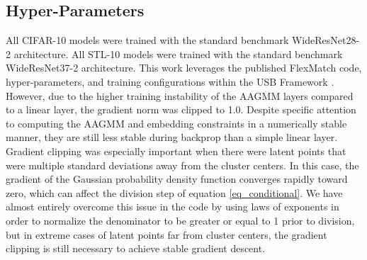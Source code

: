 \documentclass[10pt,twocolumn,letterpaper]{article}
\begin{document}
\subsection{Hyper-Parameters}
\label{hyperparams}

All CIFAR-10 models were trained with the standard benchmark WideResNet28-2 architecture.
All STL-10 models were trained with the standard benchmark WideResNet37-2 architecture.
This work leverages the published FlexMatch \cite{zhang2021flexmatch} code, hyper-parameters, and training configurations within the USB Framework \cite{wang2022usb}.
However, due to the higher training instability of the AAGMM layers compared to a linear layer, the gradient norm was clipped to 1.0.
Despite specific attention to computing the AAGMM and embedding constraints in a numerically stable manner, they are still less stable during backprop than a simple linear layer.  
Gradient clipping was especially important when there were latent points that were multiple standard deviations away from the cluster centers.  
In this case, the gradient of the Gaussian probability density function converges rapidly toward zero, which can affect the division step of equation \ref{eq_conditional}.  
We have almost entirely overcome this issue in the code by using laws of exponents in order to normalize the denominator to be greater or equal to 1 prior to division, but in extreme cases of latent points far from cluster centers, the gradient clipping is still necessary to achieve stable gradient descent.
\end{document}
